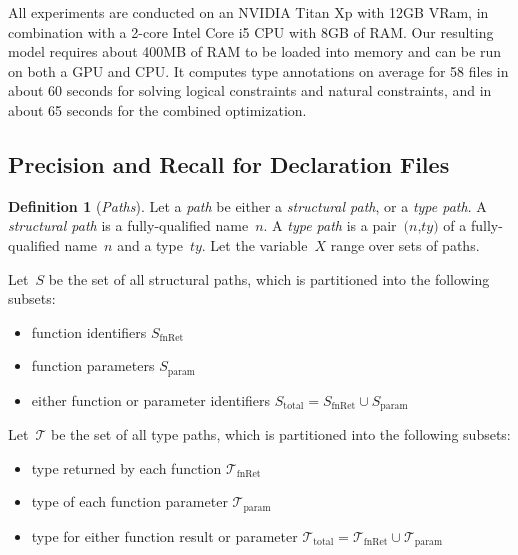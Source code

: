 \documentclass[sigplan,10pt,review,anonymous]{acmart} %
\newcommand{\margincomment}[2]{\marginpar{\scriptsize\color{Maroon}#1 says: #2}}
\newcommand{\ivp}[1]{\margincomment{IVP}{#1}}
\theoremstyle{plain}
\theoremstyle{remark}
\theoremstyle{definition}
\newtheorem{defn}{Definition}[section]
\begin{document}
All experiments are conducted on an NVIDIA Titan Xp with 12GB VRam,
in combination with a 2-core Intel Core i5 CPU with 8GB of RAM.
Our resulting model requires about 400MB of RAM to be loaded into memory and can be run on both a GPU and CPU.
It computes type annotations on average for 58 files in about 60 seconds
for solving logical constraints and natural constraints, and in about 65 seconds for the combined optimization.
\subsection{Precision and Recall for Declaration Files}

\begin{defn}[\emph{Paths}]
	Let a \emph{path} be either a \emph{structural path}, or a \emph{type path}.
	A \emph{structural path} is a fully-qualified name~$\textit{n}$.
	A \emph{type path} is a pair~$\textit{(n,ty)}$ of a fully-qualified name~$\textit{n}$ and a type~$\textit{ty}$.
	Let the variable~$X$ range over sets of paths.
\end{defn}

Let~$S$ be the set of all structural paths,
which is partitioned into the following subsets:
\begin{itemize}[label={\tiny$\bullet$}]
	\item function identifiers $S_\text{fnRet}$
	\item function  parameters $S_\text{param}$
	\item either function or parameter identifiers $S_\text{total} = S_\text{fnRet} \cup S_\text{param}$
\end{itemize}

Let~$\mathcal{T}$ be the set of all type paths,
which is partitioned into the following subsets:
\begin{itemize}[label={\tiny$\bullet$}]
	\item type returned by each function $\mathcal{T}_\text{fnRet}$
	\item type of each function parameter $\mathcal{T}_\text{param}$
	\item type for either function result or parameter $\mathcal{T}_\text{total} = \mathcal{T}_\text{fnRet} \cup \mathcal{T}_\text{param}$
\end{itemize}
\end{document}
